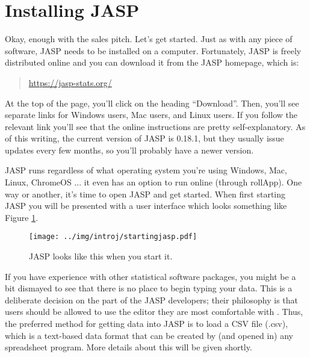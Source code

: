 \section{Installing JASP \label{sec:gettingjasp}}

Okay, enough with the sales pitch. Let's get started. Just as with any piece of software, JASP needs to be installed on a computer. Fortunately, JASP is freely distributed online and you can download it from the JASP homepage, which is:
\begin{quote}
\url{https://jasp-stats.org/}
\end{quote}
At the top of the page, you'll click on the heading ``Download''. Then, you'll see separate links for Windows users, Mac users, and Linux users. If you follow the relevant link you'll see that the online instructions are pretty self-explanatory. As of this writing, the current version of JASP is 0.18.1, but they usually issue updates every few months, so you'll probably have a newer version.


JASP runs regardless of what operating system you're using Windows, Mac, Linux, ChromeOS ... it even has an option to run online (through rollApp). One way or another, it's time to open JASP and get started. When first starting JASP you will be presented with a user interface which looks something like Figure \ref{fig:startingjasp}.

\begin{figure}[ht]
\begin{center}
\texttt{[image: ../img/introj/startingjasp.pdf]}
\caption{JASP looks like this when you start it.}
\label{fig:startingjasp}
\end{center}
\end{figure}

If you have experience with other statistical software packages, you might be a bit dismayed to see that there is no place to begin typing your data. This is a deliberate decision on the part of the JASP developers; their philosophy is that users should be allowed to use the editor they are most comfortable with . Thus, the preferred method for getting data into JASP is to load a CSV file (.csv), which is a text-based data format that can be created by (and opened in) any spreadsheet program. More details about this will be given shortly. 

